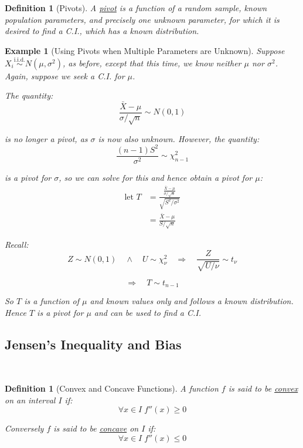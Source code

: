 \documentclass[12pt,a4paper]{article}
\newtheorem{defn}[thm]{Definition}
\newtheorem{ex}[thm]{Example}
\begin{document}
\begin{defn}[Pivots]\vspace{1cm}

A \underline{pivot} is a function of a random sample, known population parameters, and precisely one unknown parameter, for which it is desired to find a C.I., which has a known distribution.

\end{defn}

\begin{ex}[Using Pivots when Multiple Parameters are Unknown]\vspace{1cm}

Suppose $X_i \overset{\text{i.i.d.}}{\sim} N(\mu,\sigma^2)$, as before, except that this time, we know neither $\mu$ nor $\sigma^2$. Again, suppose we seek a C.I. for $\mu$.

The quantity:
$$\frac{\bar{X}-\mu}{\sigma/\sqrt{n}} \sim N(0,1)$$

is no longer a pivot, as $\sigma$ is now also unknown. However, the quantity:
$$\frac{(n-1)S^2}{\sigma^2} \sim \chi^2_{n-1}$$

is a pivot for $\sigma$, so we can solve for this and hence obtain a pivot for $\mu$:
\begin{align*}
\text{let } T &= \frac{\frac{\bar{X}-\mu}{\sigma/\sqrt{n}}}{\sqrt{S^2/\sigma^2}}\\
&= \frac{\bar{X}-\mu}{S/\sqrt{n}}
\end{align*}

Recall:
$$Z\sim N(0,1) \quad \wedge\quad U \sim \chi^2_\nu \quad \Rightarrow\quad \frac{Z}{\sqrt{U/\nu}} \sim t_\nu$$

$$\Rightarrow\quad T \sim t_{n-1}$$

So $T$ is a function of $\mu$ and known values only and follows a known distribution. Hence $T$ is a pivot for $\mu$ and can be used to find a C.I.

\end{ex}

\subsection{Jensen's Inequality and Bias}$\;$

\begin{defn}[Convex and Concave Functions]\vspace{1cm}

A function $f$ is said to be \underline{convex} on an interval $I$ if:
$$\forall x\in I\;f''(x) \geq 0$$\par\vspace{1cm}

Conversely $f$ is said to be \underline{concave} on $I$ if:
$$\forall x \in I \; f''(x) \leq 0$$\par\vspace{1cm}

\end{defn}
\end{document}
